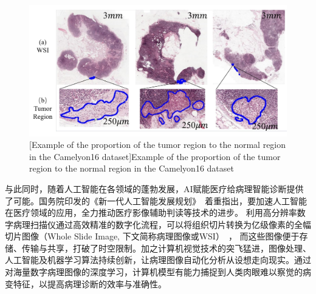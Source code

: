 \begin{figure}[h]
    \centering
    \includegraphics[width=1.0\columnwidth]{figures/fig1.pdf}
    [Example of the proportion of the tumor region to the normal region in the Camelyon16 dataset]{Example of the proportion of the tumor region to the normal region in the Camelyon16 dataset}
    \label{figure1: WSI图像肿瘤区域示意图}
\end{figure}
与此同时，随着人工智能在各领域的蓬勃发展，AI赋能医疗给病理智能诊断提供了可能。国务院印发的《新一代人工智能发展规划》~\cite{NewGenAIDevPlan}着重指出，要加速人工智能在医疗领域的应用，全力推动医疗影像辅助判读等技术的进步。
利用高分辨率数字病理扫描仪通过高效精准的数字化流程，可以将组织切片转换为亿级像素的全幅切片图像（Whole Slide Image, 下文简称病理图像或WSI）~\cite{唐仲平2018全切片图像扫描技术在临床病理诊断工作中的应用}，
而这些图像便于存储、传输与共享，打破了时空限制。加之计算机视觉技术的突飞猛进，图像处理、人工智能及机器学习算法持续创新，让病理图像自动化分析从设想走向现实。通过对海量数字病理图像的深度学习，计算机模型有能力捕捉到人类肉眼难以察觉的病变特征，以提高病理诊断的效率与准确性。

